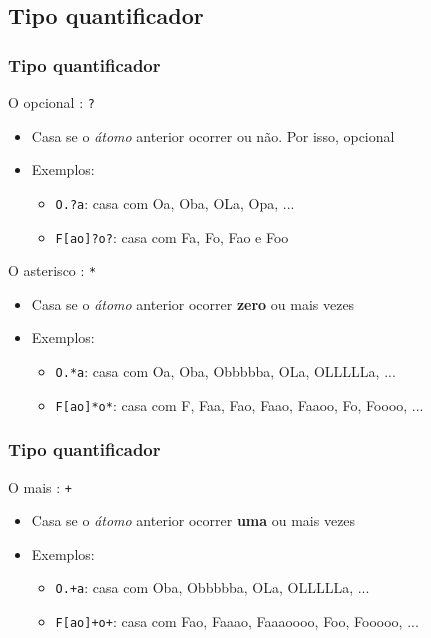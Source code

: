 \documentclass{beamer}
\begin{document}
\subsection{Tipo quantificador}
\begin{frame}
 \frametitle{Tipo quantificador}
 \begin{block}{O opcional : \texttt{?}}
  \begin{itemize}
   \item Casa se o \textit{átomo} anterior ocorrer ou não. Por isso, opcional
	\pause
   \item Exemplos:
	\begin{itemize}
	 \item \texttt{O.?a}: casa com Oa, Oba, OLa, Opa, ...
	  \pause
	 \item \texttt{F[ao]?o?}: casa com Fa, Fo, Fao e Foo
	\end{itemize}
  \end{itemize}
 \end{block}

 \pause
 \begin{block}{O asterisco : \texttt{*}}
  \begin{itemize}
   \item Casa se o \textit{átomo} anterior ocorrer \textbf{zero} ou mais vezes
	\pause
   \item Exemplos:
	\begin{itemize}
	 \item \texttt{O.*a}: casa com Oa, Oba, Obbbbba, OLa, OLLLLLa, ...
	  \pause
	 \item \texttt{F[ao]*o*}: casa com F, Faa, Fao, Faao, Faaoo, Fo, Foooo, ...
	\end{itemize}
  \end{itemize}
 \end{block}
\end{frame}

\begin{frame}
 \frametitle{Tipo quantificador}
 \begin{block}{O mais : \texttt{+}}
  \begin{itemize}
   \item Casa se o \textit{átomo} anterior ocorrer \textbf{uma} ou mais vezes
	\pause
   \item Exemplos:
	\begin{itemize}
	 \item \texttt{O.+a}: casa com Oba, Obbbbba, OLa, OLLLLLa, ...
	  \pause
	 \item \texttt{F[ao]+o+}: casa com Fao, Faaao, Faaaoooo, Foo, Fooooo, ...
	\end{itemize}
  \end{itemize}
 \end{block}
\end{frame}
\end{document}
